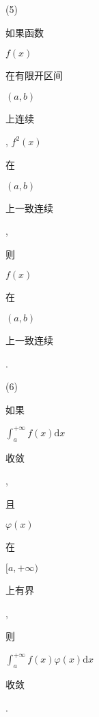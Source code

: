 \documentclass[10pt]{article}
\begin{document}
(5) \begin{CJK}{UTF8}{mj}如果函数\end{CJK} $f(x)$ \begin{CJK}{UTF8}{mj}在有限开区间\end{CJK} $(a, b)$ \begin{CJK}{UTF8}{mj}上连续\end{CJK}, $f^{2}(x)$ \begin{CJK}{UTF8}{mj}在\end{CJK} $(a, b)$ \begin{CJK}{UTF8}{mj}上一致连续\end{CJK}, \begin{CJK}{UTF8}{mj}则\end{CJK} $f(x)$ \begin{CJK}{UTF8}{mj}在\end{CJK} $(a, b)$ \begin{CJK}{UTF8}{mj}上一致连续\end{CJK}.

(6) \begin{CJK}{UTF8}{mj}如果\end{CJK} $\int_{a}^{+\infty} f(x) \mathrm{d} x$ \begin{CJK}{UTF8}{mj}收敛\end{CJK}, \begin{CJK}{UTF8}{mj}且\end{CJK} $\varphi(x)$ \begin{CJK}{UTF8}{mj}在\end{CJK} $[a,+\infty)$ \begin{CJK}{UTF8}{mj}上有界\end{CJK}, \begin{CJK}{UTF8}{mj}则\end{CJK} $\int_{a}^{+\infty} f(x) \varphi(x) \mathrm{d} x$ \begin{CJK}{UTF8}{mj}收敛\end{CJK}.
\end{document}
